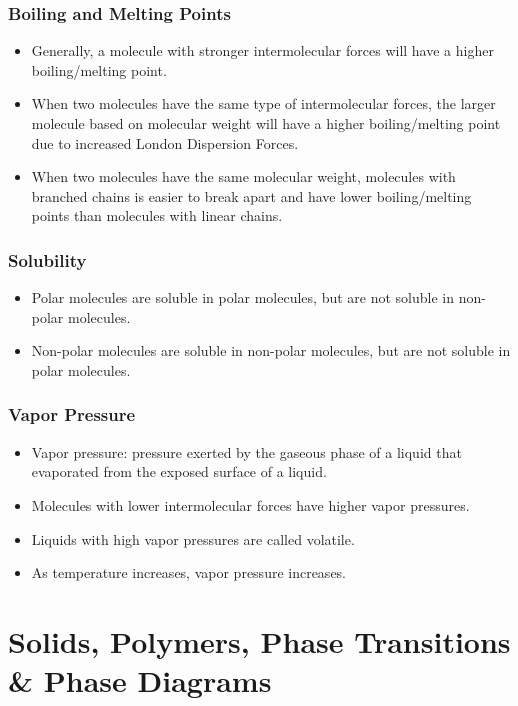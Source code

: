 \documentclass{article}
\begin{document}
\subsubsection{Boiling and Melting Points}

\begin{itemize}
    \item Generally, a molecule with stronger intermolecular forces will have a higher boiling/melting point.
    \item When two molecules have the same type of intermolecular forces, the larger molecule based on molecular weight will have a higher boiling/melting point due to increased London Dispersion Forces.
    \item When two molecules have the same molecular weight, molecules with branched chains is easier to break apart and have lower boiling/melting points than molecules with linear chains. 
\end{itemize}

\subsubsection{Solubility}

\begin{itemize}
    \item Polar molecules are soluble in polar molecules, but are not soluble in non-polar molecules.
    \item Non-polar molecules are soluble in non-polar molecules, but are not soluble in polar molecules.
\end{itemize}

\subsubsection{Vapor Pressure}

\begin{itemize}
    \item Vapor pressure: pressure exerted by the gaseous phase of a liquid that evaporated from the exposed surface of a liquid.
    \item Molecules with lower intermolecular forces have higher vapor pressures. 
    \item Liquids with high vapor pressures are called volatile.
    \item As temperature increases, vapor pressure increases.
\end{itemize}

\section{Solids, Polymers, Phase Transitions \& Phase Diagrams}
\end{document}
